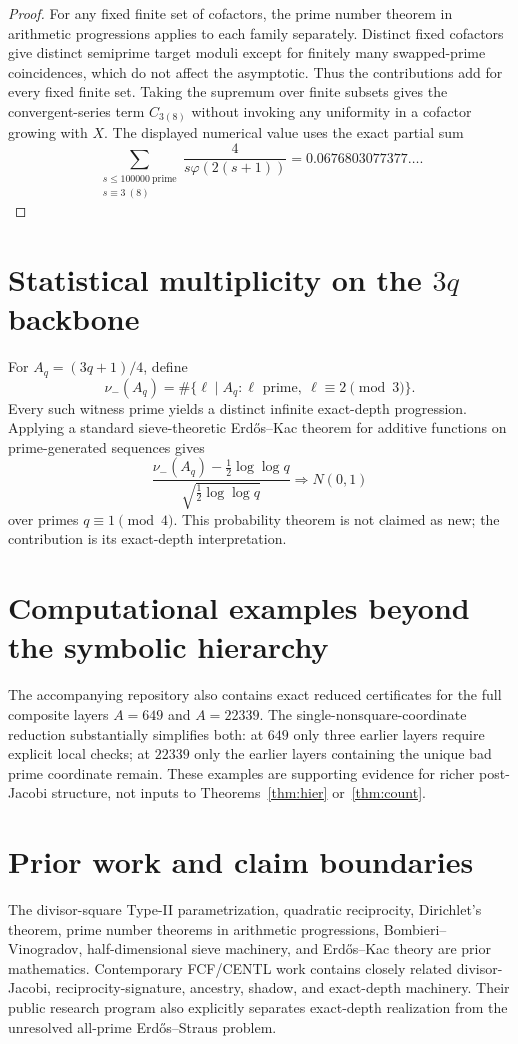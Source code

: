 \documentclass[11pt]{article}
\theoremstyle{definition}
\begin{document}
\begin{proof}
For any fixed finite set of cofactors, the prime number theorem in arithmetic progressions applies to each family separately. Distinct fixed cofactors give distinct semiprime target moduli except for finitely many swapped-prime coincidences, which do not affect the asymptotic. Thus the contributions add for every fixed finite set. Taking the supremum over finite subsets gives the convergent-series term $C_{3(8)}$ without invoking any uniformity in a cofactor growing with $X$. The displayed numerical value uses the exact partial sum
\[
\sum_{\substack{s\le100000\ \mathrm{prime}\\s\equiv3\ (8)}}
\frac{4}{s\varphi(2(s+1))}
=0.0676803077377\ldots .
\]
\end{proof}

\section{Statistical multiplicity on the $3q$ backbone}
For $A_q=(3q+1)/4$, define
\[
\nu_-(A_q)=\#\{\ell\mid A_q:\ell\text{ prime},\ \ell\equiv2\pmod3\}.
\]
Every such witness prime yields a distinct infinite exact-depth progression. Applying a standard sieve-theoretic Erd\H{o}s--Kac theorem for additive functions on prime-generated sequences gives
\[
\frac{\nu_-(A_q)-\frac12\log\log q}
{\sqrt{\frac12\log\log q}}
\Longrightarrow N(0,1)
\]
over primes $q\equiv1\pmod4$. This probability theorem is not claimed as new; the contribution is its exact-depth interpretation.

\section{Computational examples beyond the symbolic hierarchy}
The accompanying repository also contains exact reduced certificates for the full composite layers $A=649$ and $A=22339$. The single-nonsquare-coordinate reduction substantially simplifies both: at $649$ only three earlier layers require explicit local checks; at $22339$ only the earlier layers containing the unique bad prime coordinate remain. These examples are supporting evidence for richer post-Jacobi structure, not inputs to Theorems~\ref{thm:hier} or~\ref{thm:count}.

\section{Prior work and claim boundaries}
The divisor-square Type-II parametrization, quadratic reciprocity, Dirichlet's theorem, prime number theorems in arithmetic progressions, Bombieri--Vinogradov, half-dimensional sieve machinery, and Erd\H{o}s--Kac theory are prior mathematics. Contemporary FCF/CENTL work contains closely related divisor-Jacobi, reciprocity-signature, ancestry, shadow, and exact-depth machinery. Their public research program also explicitly separates exact-depth realization from the unresolved all-prime Erd\H{o}s--Straus problem.
\end{document}

